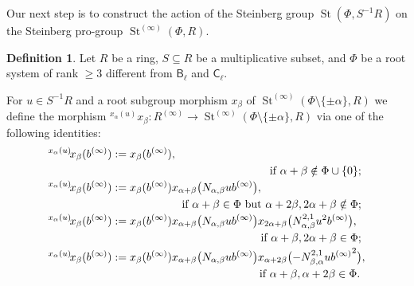 \documentclass{article}
\numberwithin{equation}{section}
\theoremstyle{definition}
\newtheorem{df}[lemma]{Definition} \Crefname{df}{Definition}{Definitions}
\theoremstyle{remark}
\DeclareMathOperator\St{St}
\DeclareMathOperator\GG{G}
\DeclareMathOperator\Torus{T}
\newcommand{\up}[2]{{^{#1}\!{#2}}}
\newcommand{\rB}{\mathsf{B}}
\newcommand{\rC}{\mathsf{C}}
\begin{document}
Our next step is to construct the action of the Steinberg group $\St(\Phi, S^{-1}R)$ on the Steinberg pro-group $\St^{(\infty)}(\Phi, R)$.
\begin{df}\label{root-action}
 Let \(R\) be a ring, \(S \subseteq R\) be a multiplicative subset, and \(\Phi\) be a root system of rank \(\geq 3\) different from \(\rB_\ell\) and \(\rC_\ell\).
 
 For $u \in S^{-1}R$ and a root subgroup morphism $x_\beta$ of $\St^{(\infty)}(\Phi\setminus\{\pm\alpha\}, R)$ we define the morphism 
 $\up{x_\alpha(u)}x_\beta \colon R^{(\infty)} \to \St^{(\infty)}(\Phi\setminus\{\pm\alpha\}, R)$
 via one of the following identities:
 \begin{align*}
 \up{x_\alpha(u)}{x_\beta(b^{(\infty)})}
 &:= x_\beta(b^{(\infty)}), \\
 \multispan2{\hfil if $\alpha + \beta \notin \Phi \cup \{0\}$;} \\
 \up{x_\alpha(u)}{x_\beta(b^{(\infty)})}
 &:= x_\beta(b^{(\infty)})
 x_{\alpha + \beta}\bigl(N_{\alpha, \beta} u b^{(\infty)}\bigr), \\
 \multispan2{\hfill if $\alpha + \beta \in \Phi$ but $\alpha + 2\beta, 2\alpha + \beta \notin \Phi$;} \\
 \up{x_\alpha(u)}{x_\beta(b^{(\infty)})}
 &:= x_\beta(b^{(\infty)})
  x_{\alpha + \beta}\bigl(N_{\alpha, \beta} u b^{(\infty)}\bigr)
  x_{2\alpha + \beta}\bigl(N^{2,1}_{\alpha, \beta} u^2 b^{(\infty)}\bigr), \\
 \multispan2{\hfill if $\alpha + \beta, 2\alpha + \beta \in \Phi$;} \\
 \up{x_\alpha(u)}{x_\beta(b^{(\infty)})}
 &:= x_\beta(b^{(\infty)})
  x_{\alpha + \beta}\bigl(N_{\alpha, \beta} u b^{(\infty)}\bigr)
  x_{\alpha + 2\beta}\bigl(-N^{2,1}_{\beta, \alpha} u {b^{(\infty)}}^2\bigr), \\
 \multispan2{\hfill if $\alpha + \beta, \alpha + 2\beta \in \Phi$.}
 \end{align*} 
\end{df}
\end{document}
